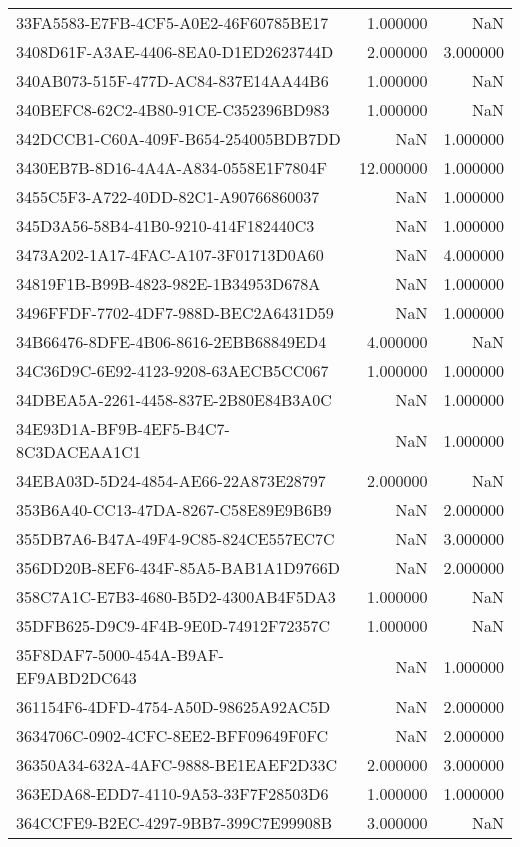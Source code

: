 \begin{tabular}{lrr}
33FA5583-E7FB-4CF5-A0E2-46F60785BE17 & 1.000000 & NaN \\
3408D61F-A3AE-4406-8EA0-D1ED2623744D & 2.000000 & 3.000000 \\
340AB073-515F-477D-AC84-837E14AA44B6 & 1.000000 & NaN \\
340BEFC8-62C2-4B80-91CE-C352396BD983 & 1.000000 & NaN \\
342DCCB1-C60A-409F-B654-254005BDB7DD & NaN & 1.000000 \\
3430EB7B-8D16-4A4A-A834-0558E1F7804F & 12.000000 & 1.000000 \\
3455C5F3-A722-40DD-82C1-A90766860037 & NaN & 1.000000 \\
345D3A56-58B4-41B0-9210-414F182440C3 & NaN & 1.000000 \\
3473A202-1A17-4FAC-A107-3F01713D0A60 & NaN & 4.000000 \\
34819F1B-B99B-4823-982E-1B34953D678A & NaN & 1.000000 \\
3496FFDF-7702-4DF7-988D-BEC2A6431D59 & NaN & 1.000000 \\
34B66476-8DFE-4B06-8616-2EBB68849ED4 & 4.000000 & NaN \\
34C36D9C-6E92-4123-9208-63AECB5CC067 & 1.000000 & 1.000000 \\
34DBEA5A-2261-4458-837E-2B80E84B3A0C & NaN & 1.000000 \\
34E93D1A-BF9B-4EF5-B4C7-8C3DACEAA1C1 & NaN & 1.000000 \\
34EBA03D-5D24-4854-AE66-22A873E28797 & 2.000000 & NaN \\
353B6A40-CC13-47DA-8267-C58E89E9B6B9 & NaN & 2.000000 \\
355DB7A6-B47A-49F4-9C85-824CE557EC7C & NaN & 3.000000 \\
356DD20B-8EF6-434F-85A5-BAB1A1D9766D & NaN & 2.000000 \\
358C7A1C-E7B3-4680-B5D2-4300AB4F5DA3 & 1.000000 & NaN \\
35DFB625-D9C9-4F4B-9E0D-74912F72357C & 1.000000 & NaN \\
35F8DAF7-5000-454A-B9AF-EF9ABD2DC643 & NaN & 1.000000 \\
361154F6-4DFD-4754-A50D-98625A92AC5D & NaN & 2.000000 \\
3634706C-0902-4CFC-8EE2-BFF09649F0FC & NaN & 2.000000 \\
36350A34-632A-4AFC-9888-BE1EAEF2D33C & 2.000000 & 3.000000 \\
363EDA68-EDD7-4110-9A53-33F7F28503D6 & 1.000000 & 1.000000 \\
364CCFE9-B2EC-4297-9BB7-399C7E99908B & 3.000000 & NaN \\

\end{tabular}
